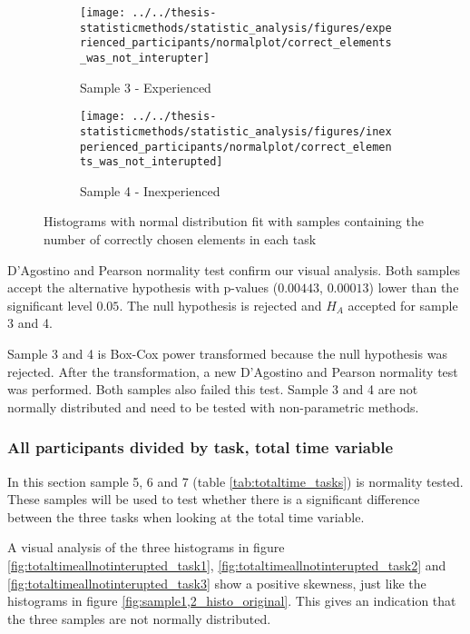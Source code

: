 \begin{figure}[h!]
	\centering
	\begin{subfigure}[b]{0.48\textwidth}
		\centering
		\texttt{[image: ../../thesis-statisticmethods/statistic\_analysis/figures/experienced\_participants/normalplot/correct\_elements\_was\_not\_interupter]}
		\caption{Sample 3 - Experienced}
		\label{fig:correctelementswasnotinterupter_ex}
	\end{subfigure}
	\begin{subfigure}[b]{0.48\textwidth}
		\centering
		\texttt{[image: ../../thesis-statisticmethods/statistic\_analysis/figures/inexperienced\_participants/normalplot/correct\_elements\_was\_not\_interupted]}
		\caption{Sample 4 - Inexperienced}
		\label{fig:correctelementswasnotinterupted_inex}
	\end{subfigure}
	\caption{Histograms with normal distribution fit with samples containing the number of correctly chosen elements in each task}
\end{figure}

D'Agostino and Pearson normality test confirm our visual analysis. Both samples accept the alternative hypothesis with p-values ($0.00443$, $0.00013$) lower than the significant level $0.05$. The null hypothesis is rejected and $H_A$ accepted for sample 3 and 4.

Sample 3 and 4 is Box-Cox power transformed because the null hypothesis was rejected. After the transformation, a new D'Agostino and Pearson normality test was performed. Both samples also failed this test. Sample 3 and 4 are not normally distributed and need to be tested with non-parametric methods. 

\subsubsection[Sample 5, 6 and 7]{All participants divided by task, total time variable}\label{sec:task123_time_normaltest}

In this section sample 5, 6 and 7 (table \ref{tab:totaltime_tasks}) is normality tested. These samples will be used to test whether there is a significant difference between the three tasks when looking at the total time variable. 

A visual analysis of the three histograms in figure \ref{fig:totaltimeallnotinterupted_task1}, \ref{fig:totaltimeallnotinterupted_task2} and \ref{fig:totaltimeallnotinterupted_task3} show a positive skewness, just like the histograms in figure \ref{fig:sample1,2_histo_original}. This gives an indication that the three samples are not normally distributed. 

